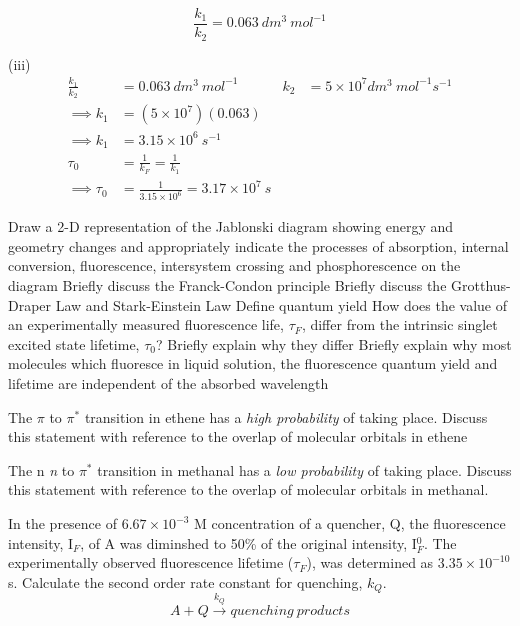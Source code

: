 \documentclass[ignorenonframetext]{beamer}
\begin{document}
\begin{ExerciseList}
\begin{center}
\end{center}

\[\frac{k_1}{k_2} = 0.063\ dm^3\ mol^{-1}\]

(iii)
\begin{align*}
\frac{k_1}{k_2} &= 0.063\ dm^3\ mol^{-1}	&	k_2 &= 5\times 10^7 dm^3\ mol^{-1}s^{-1}\\
\implies k_1 &= (5\times10^7)(0.063)\\
\implies k_1 &= 3.15\times10^6\ s^{-1}\\
\tau_0 &=\frac{1}{k_F} = \frac{1}{k_1}\\
\implies \tau_0 &= \frac{1}{3.15\times10^6} = 3.17\times10^7\ s
\end{align*}

\Exercise Draw a 2-D representation of the Jablonski diagram showing energy and geometry changes and appropriately indicate the processes of absorption, internal conversion, fluorescence, intersystem crossing and phosphorescence on the diagram
\Exercise Briefly discuss the Franck-Condon principle
\Exercise Briefly discuss the Grotthus-Draper Law and Stark-Einstein Law
\Exercise Define quantum yield
\Exercise How does the value of an experimentally measured fluorescence life, \(\tau_F\), differ from the intrinsic singlet excited state lifetime, \(\tau_0\)? Briefly explain why they differ
\Exercise Briefly explain why most molecules which fluoresce in liquid solution, the fluorescence quantum yield and lifetime are independent of the absorbed wavelength

\Exercise The \(\pi\) to \(\pi^*\) transition in ethene has a \emph{high probability} of taking place. Discuss this statement with reference to the overlap of molecular orbitals in ethene

\Exercise The n \textit{n} to \(\pi^*\) transition in methanal has a \emph{low probability} of taking place. Discuss this statement with reference to the overlap of molecular orbitals in methanal.

\Exercise In the presence of \(6.67\times10^{-3}\) M concentration of a quencher, Q, the fluorescence intensity, I\(_F\), of A was diminshed to 50\% of the original intensity, I\(^0_F\). The experimentally observed fluorescence lifetime (\(\tau_F\)), was determined as \(3.35\times 10^{-10}\) s. Calculate the second order rate constant for quenching, \(k_Q\).
\[ A + Q \xrightarrow{k_Q} quenching\ products\]


\end{ExerciseList}
\end{document}

